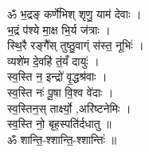 ॐ भ॒द्रङ् कर्णे॑भिश् शृणु॒ याम॑ देवाः ।\\
भ॒द्रं प॑श्ये मा॒क्ष भि॒र्य ज॑त्राः ।\\
स्थि॒रै रङ्गै᳚स् तुष्ठु॒वाग्ं स॑स्त॒ नूभिः॑ ।\\
व्यशे॑म दे॒वहि॑ तं॒यँ दायुः॑ ।\\
स्व॒स्ति न॒ इन्द्रो॑ वृ॒द्धश्र॑वाः ।\\
स्व॒स्ति नः॑ पू॒षा वि॒श्व वे॑दाः ।\\
स्व॒स्तिन॒स् तार्क्ष्यो॒ ,अरि॑ष्टनेमिः ।\\
स्व॒स्ति नो॒ बृह॒स्पति॑र्दधातु ॥\\
ॐ शान्ति॒-श्शान्ति॒-श्शान्तिः॑ ॥\\